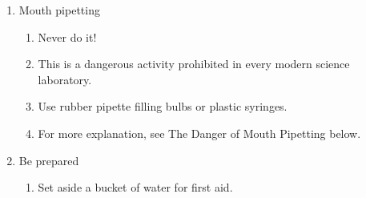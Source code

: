 \begin{enumerate}
\begin{enumerate}
\begin{enumerate}
{move him/her outside until fully recovered.}
\item{Check unconscious students for breath and a pulse.}
\item{Perform CPR if necessary and you know how.}
\item{Generally, these ailments suggest 
that harmful gases are present in the lab -- 
find out what is producing them and stop it. 
Kerosene stoves, for example, may emit enough fumes to have this effect.}
\item{See Sources of Heat in the Materials section for alternatives.}
\item{Chemicals reacting in drain pipes can also emit harmful gases. 
See Waste Disposal.}
\end{enumerate}
\item{Electrocution -- If someone is being electrocuted 
(their body is in contact with a live wire)}
\begin{enumerate}
\item{First disconnect the power source. 
Turn off the switch or disconnect the batteries.}
\item{If that is not possible, use a non-conducting object, 
like a wood stick or branch, to move them away from the source of electricity.}
\item{Unless there is a lot of water around, 
the sole of your shoe is non-conducting.}
\end{enumerate}
\item{Seizure}
\begin{enumerate}
\item{If a student experiences a seizure, 
move everything away from him/her 
and then let the body finish moving on its own.}
\end{enumerate}
\end{enumerate}
\item{Mouth pipetting}
\begin{enumerate}
\item{Never do it!}
\item{This is a dangerous activity 
prohibited in every modern science laboratory.}
\item{Use rubber pipette filling bulbs or plastic syringes.}
\item{For more explanation, see The Danger of Mouth Pipetting below.}
\end{enumerate}
\item{Be prepared}
\begin{enumerate}
\item{Set aside a bucket of water for first aid.}

\end{enumerate}
\end{enumerate}
